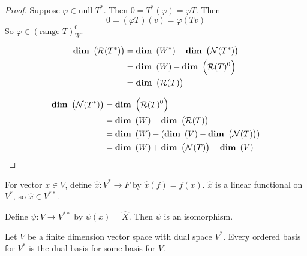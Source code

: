 \begin{proof}
    Suppose $\varphi \in \text{null } T^*$. Then $ 0 = T^*(\varphi) = \varphi T$. Then
    \begin{equation*}
        0 = (\varphi T)(v) = \varphi (Tv) 
    \end{equation*}
    So $\varphi \in (\text{range } T)^0_W$.
    
    \begin{equation*}
        \begin{aligned}
            \displaystyle \mathop{\bf dim\/}~\left( \mathcal{R}(T^*) \right) &= \displaystyle \mathop{\bf dim\/}~\left( W^* \right) - \displaystyle \mathop{\bf dim\/}~\left( \mathcal{N}(T^*) \right) \\
            &= \displaystyle \mathop{\bf dim\/}~\left( W \right) - \displaystyle \mathop{\bf dim\/}~\left( \mathcal{R}(T)^0 \right) \\
            &= \displaystyle \mathop{\bf dim\/}~\left( \mathcal{R}(T) \right)
        \end{aligned}
    \end{equation*}
    
    \begin{equation*}
        \begin{aligned}
            \displaystyle \mathop{\bf dim\/}~\left( \mathcal{N}(T^*) \right) &= \displaystyle \mathop{\bf dim\/}~\left( \mathcal{R}(T)^0 \right)\\
            &= \displaystyle \mathop{\bf dim\/}~\left( W \right) - \displaystyle \mathop{\bf dim\/}~\left( \mathcal{R}(T) \right) \\
            &= \displaystyle \mathop{\bf dim\/}~\left( W \right) - (\displaystyle \mathop{\bf dim\/}~\left( V \right) - \displaystyle \mathop{\bf dim\/}~\left( \mathcal{N}(T) \right) ) \\
            &= \displaystyle \mathop{\bf dim\/}~\left( W \right) + \displaystyle \mathop{\bf dim\/}~\left( \mathcal{N}(T) \right) - \displaystyle \mathop{\bf dim\/}~\left( V \right)
        \end{aligned}
    \end{equation*}
\end{proof}


\begin{definition}
    For vector $x \in V$, define $\hat{x}: V^* \rightarrow F $ by $\hat{x}(f) = f(x)$. $\hat{x}$ is a linear functional on $V^*$, so $\hat{x} \in V^{**}$.
\end{definition}


\begin{theorem}
    Define $\psi : V \rightarrow V^{**}$ by $\psi (x) = \hat{X}$.  Then $\psi$ is an isomorphism.
\end{theorem}

\begin{theorem}
    Let $V$ be a finite dimension vector space with dual space $V^*$. Every ordered basis for $V^*$ is the dual basis for some basis for $V$.
\end{theorem}

\begin{center}
\end{center}



